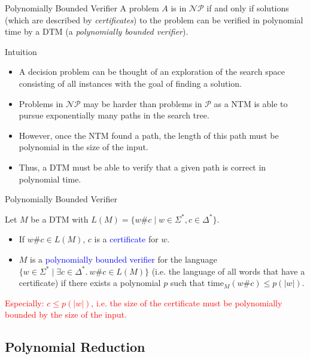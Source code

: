 \documentclass{beamer}
\theoremstyle{definition}
\def\spadding{\vspace{0.25cm}}
\def\b{\textcolor{blue}}
\def\r{\textcolor{red}}
\begin{document}
\begin{frame}{Polynomially Bounded Verifier}
    A problem $A$ is in $\mathcal{NP}$ if and only if solutions (which are described by \emph{certificates}) to the problem can be verified in polynomial time by a DTM (a \emph{polynomially bounded verifier}).\pause\par\spadding
    \begin{block}{Intuition}
        \begin{itemize}
            \item A decision problem can be thought of an exploration of the search space consisting of all instances with the goal of finding a solution.\pause
            \item Problems in $\mathcal{NP}$ may be harder than problems in $\mathcal{P}$ as a NTM is able to pursue exponentially many paths in the search tree.\pause
            \item However, once the NTM found a path, the length of this path must be polynomial in the size of the input.\pause
            \item Thus, a DTM must be able to verify that a given path is correct in polynomial time.
        \end{itemize}
    \end{block}
\end{frame}

\begin{frame}{Polynomially Bounded Verifier}
    \begin{definition}
        Let $M$ be a DTM with $L(M) = \{w\#c \mid w \in \Sigma^*, c \in \Delta^*\}$.\pause
        \begin{itemize}
            \item If $w\#c \in L(M)$, $c$ is a \b{certificate} for $w$.\pause
            \item $M$ is a \b{polynomially bounded verifier} for the language $\{w \in \Sigma^* \mid \exists c \in \Delta^*.\ w\#c \in L(M)\}$ (i.e. the language of all words that have a certificate) if there exists a polynomial $p$ such that $\text{time}_M(w\#c) \leq p(|w|)$.
        \end{itemize}\pause
        \r{Especially: $c \leq p(|w|)$, i.e. the size of the certificate must be polynomially bounded by the size of the input.}
    \end{definition}
\end{frame}

\subsection{Polynomial Reduction}
\end{document}
